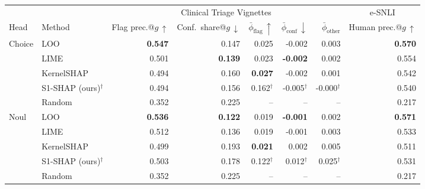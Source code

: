 \begin{tabular}{llrrrrrr}
\toprule
 & & \multicolumn{5}{c}{Clinical Triage Vignettes} & \multicolumn{1}{c}{e-SNLI} \\
\cmidrule(lr){3-7}\cmidrule(lr){8-8}
Head & Method & Flag prec.@$g\,\uparrow$ & Conf.\ share@$g\,\downarrow$ & $\bar{\phi}_{\text{flag}}\,\uparrow$ & $\bar{\phi}_{\text{conf}}\,\downarrow$ & $\bar{\phi}_{\text{other}}$ & Human prec.@$g\,\uparrow$ \\
\midrule
Choice & LOO & \textbf{0.547} & 0.147 & 0.025 & -0.002 & 0.003 & \textbf{0.570} \\
 & LIME & 0.501 & \textbf{0.139} & 0.023 & \textbf{-0.002} & 0.002 & 0.554 \\
 & KernelSHAP & 0.494 & 0.160 & \textbf{0.027} & -0.002 & 0.001 & 0.542 \\
 & S1-SHAP (ours)$^\dagger$ & 0.494 & 0.156 & 0.162$^\dagger$ & -0.005$^\dagger$ & -0.000$^\dagger$ & 0.540 \\
 & Random & 0.352 & 0.225 & -- & -- & -- & 0.217 \\
\midrule
Noul & LOO & \textbf{0.536} & \textbf{0.122} & 0.019 & \textbf{-0.001} & 0.002 & \textbf{0.571} \\
 & LIME & 0.512 & 0.136 & 0.019 & -0.001 & 0.003 & 0.533 \\
 & KernelSHAP & 0.499 & 0.193 & \textbf{0.021} & 0.002 & 0.005 & 0.511 \\
 & S1-SHAP (ours)$^\dagger$ & 0.503 & 0.178 & 0.122$^\dagger$ & 0.012$^\dagger$ & 0.025$^\dagger$ & 0.531 \\
 & Random & 0.352 & 0.225 & -- & -- & -- & 0.217 \\
\bottomrule
\end{tabular}
